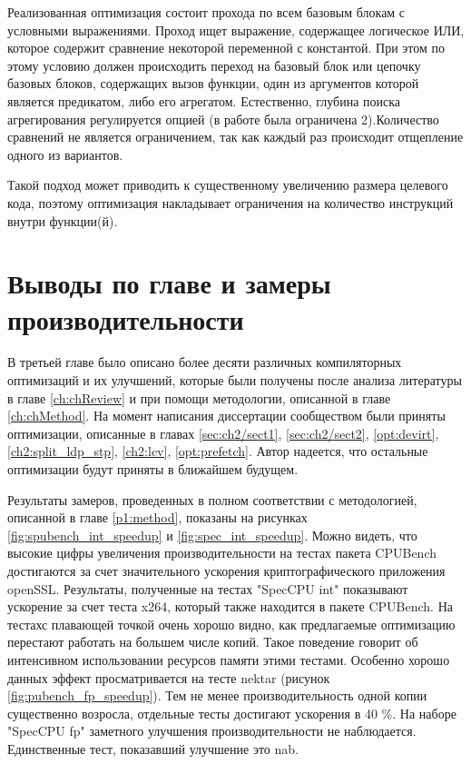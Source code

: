 Реализованная оптимизация состоит прохода по всем базовым блокам с условными выражениями.
Проход ищет выражение, содержащее логическое ИЛИ, которое содержит сравнение некоторой переменной с константой. При этом по этому условию должен происходить переход на базовый блок или цепочку базовых блоков, содержащих вызов функции,  один из аргументов которой является предикатом, либо его агрегатом. Естественно, глубина поиска агрегирования регулируется опцией (в работе была ограничена 2).Количество сравнений не  является ограничением, так как каждый раз происходит отщепление одного из вариантов. 

Такой подход может приводить к существенному увеличению размера целевого кода, поэтому оптимизация накладывает ограничения на количество инструкций внутри функции(й).

\section{Выводы по главе и замеры производительности}  \label{results}
В третьей главе  было описано более десяти различных компиляторных оптимизаций и их улучшений, которые были получены после анализа литературы в главе \ref{ch:chReview} и при помощи методологии, описанной в главе \ref{ch:chMethod}. На момент написания диссертации сообществом были приняты оптимизации, описанные в главах \ref{sec:ch2/sect1}, \ref{sec:ch2/sect2}, \ref{opt:devirt}, \ref{ch2:split_ldp_stp}, \ref{ch2:lcv}, \ref{opt:prefetch}. Автор надеется, что остальные оптимизации будут приняты в ближайшем будущем.

Результаты замеров, проведенных в полном соответствии с методологией, описанной в главе \ref{p1:method}, показаны на рисунках \ref{fig:spubench_int_speedup} и \ref{fig:spec_int_speedup}. Можно видеть, что высокие цифры увеличения производительности на тестах пакета CPUBench достигаются за счет значительного ускорения криптографического приложения openSSL. Результаты, полученные на тестах "SpecCPU int"\phantom{ } показывают ускорение за счет теста x264, который также находится в пакете CPUBench. На тестахс плавающей точкой очень хорошо видно, как предлагаемые оптимизацию перестают работать на большем числе копий. Такое поведение говорит об интенсивном использовании ресурсов памяти этими тестами. Особенно хорошо данных эффект просматривается на тесте nektar (рисунок \ref{fig:pubench_fp_speedup}). Тем не менее производительность одной копии существенно возросла, отдельные тесты достигают ускорения в 40 \%. На наборе "SpecCPU fp"\phantom{} заметного улучшения производительности не наблюдается. Единственные тест, показавший улучшение это nab.

